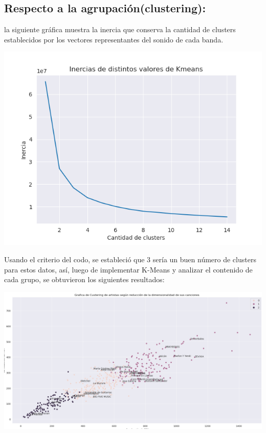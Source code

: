 \documentclass[11pt]{article}
\begin{document}
\subsection{Respecto a la agrupación(clustering):}
\label{sec:org19f694f}
la siguiente gráfica muestra la inercia que conserva la cantidad de clusters establecidos por los vectores representantes del sonido de cada banda.
\begin{center}
\begin{center}
\includegraphics[width=.9\linewidth]{./images/inercias1.png}
\end{center}
\end{center}
Usando el criterio del codo, se estableció que 3 sería un buen número de clusters para estos datos, así, luego de implementar K-Means y analizar el contenido de cada grupo, se obtuvieron los siguientes resultados:
\begin{center}
\begin{center}
\includegraphics[width=.9\linewidth]{./images/clustering1.png}
\end{center}
\end{center}
\end{document}
